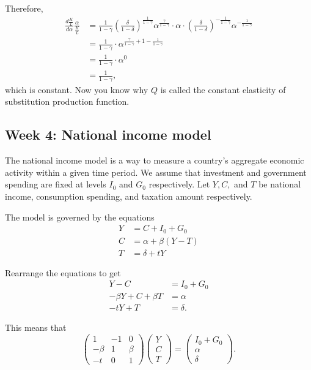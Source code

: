 \documentclass[a4paper, 12pt,oneside,openany]{book}
\begin{document}
Therefore, \begin{align*} \frac{d\frac{K}{L}}{d\alpha}\frac{\alpha}{\frac{K}{L}} &= \frac{1}{1-\gamma} \left( \frac{\delta}{1-\delta} \right)^{\frac{1}{1-\gamma}}\alpha^{\frac{\gamma}{1-\gamma}} \cdot \alpha \cdot \left( \frac{\delta}{1-\delta} \right)^{-\frac{1}{1-\gamma}} \alpha^{-\frac{1}{1-\gamma}}\\ &= \frac{1}{1-\gamma} \cdot \alpha^{\frac{\gamma}{1-\gamma}+1-\frac{1}{1-\gamma}} \\ &= \frac{1}{1-\gamma} \cdot \alpha^0 \\ &= \frac{1}{1-\gamma},\end{align*} which is constant. Now you know why $Q$ is called the constant elasticity of substitution production function.

\subsection{Week 4: National income model}

The national income model is a way to measure a country's aggregate economic activity within a given time period. We assume that investment and government spending are fixed at levels $I_0$ and $G_0$ respectively. Let $Y, C,$ and $T$ be national income, consumption spending, and taxation amount respectively. 

The model is governed by the equations \begin{align*} Y &= C+I_0+G_0 \\ C&= \alpha+\beta(Y-T) \\ T&=\delta+ tY\end{align*}

Rearrange the equations to get \begin{align*} Y-C &= I_0+G_0 \\ -\beta Y + C+\beta T&= \alpha \\ -tY+T&=\delta.\end{align*}

This means that $$\begin{pmatrix} 1 & -1 & 0 \\ -\beta & 1 & \beta \\ -t & 0 & 1\end{pmatrix} \begin{pmatrix} Y\\C\\T \end{pmatrix} = \begin{pmatrix} I_0+G_0 \\ \alpha \\ \delta \end{pmatrix}.$$ 
\end{document}
